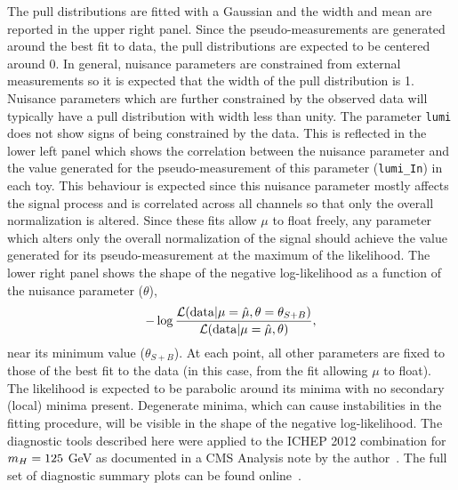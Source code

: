 The pull distributions are fitted with a Gaussian and the width and mean 
are reported in the upper right panel. Since the pseudo-measurements 
are generated around the best fit to data, the pull distributions
are expected to be centered around 0. In general, nuisance parameters
are constrained from external measurements so it is expected that the 
width of the pull distribution is 1. Nuisance parameters which are further
constrained by the observed data will typically have a pull distribution with width less
than unity. The parameter \texttt{lumi} does not show signs of being constrained
by the data. 
This is reflected in the lower left panel which shows the correlation between
the nuisance parameter and the value generated for the pseudo-measurement
of this parameter (\texttt{lumi\_In}) in each toy.
This behaviour is expected since this nuisance parameter mostly affects the signal process and 
is correlated across all channels so that only the overall
normalization is altered. Since these fits allow $\mu$ to float freely, 
any parameter which alters only the overall normalization of the signal should 
achieve the value generated for its pseudo-measurement at the maximum of the likelihood. 
The lower right panel shows the shape of the negative log-likelihood
as a function of the nuisance parameter ($\theta$),
\begin{equation}
-\log \frac{\displaystyle \mathcal{L}(\mathrm{data}|\mu=\hat{\mu},\theta=\theta_{S+B})}
		 {\displaystyle \mathcal{L}(\mathrm{data}|\mu=\hat{\mu},\theta)},
\end{equation}
near its minimum value ($\theta_{S+B}$).
At each point, all other parameters are fixed 
to those of the best fit to the data (in this case, from the fit allowing $\mu$ to float).
The likelihood is expected to be parabolic around its minima with no secondary (local) 
minima present.
Degenerate minima, which can cause instabilities in the fitting procedure, will be visible in the 
shape of the negative log-likelihood. The diagnostic tools described here were applied
to the ICHEP 2012 combination for $m_{H}=125$ GeV as documented in a CMS Analysis note by the 
author~\citep{AN-12-317}. 
The full set of diagnostic summary plots can be found online~\citep{onlinediag}.
